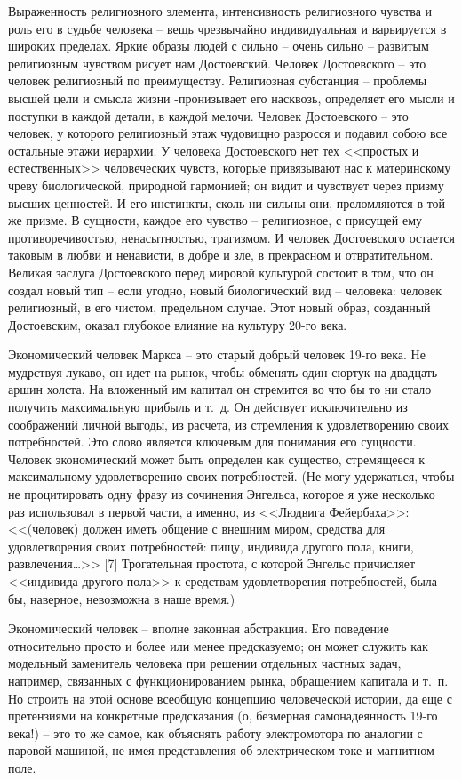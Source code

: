 \documentclass{book}
\begin{document}
Выраженность религиозного элемента, интенсивность рели­гиозного чувства и роль его в судьбе человека -- вещь чрезвы­чайно индивидуальная и варьируется в широких пределах. Яр­кие образы людей с сильно -- очень сильно -- развитым религи­озным чувством рисует нам Достоевский. Человек Достоев­ского -- это человек религиозный по преимуществу.  Религиоз­ная субстанция -- проблемы высшей цели и смысла жизни -пронизывает его насквозь, определяет его мысли и поступки в каждой детали, в каждой мелочи. Человек Достоевского -- это человек, у которого религиозный этаж чудовищно разрос­ся и подавил собою все остальные этажи иерархии. У человека Достоевского нет тех <<простых и естественных>> человеческих чувств, которые привязывают нас к материнскому чреву био­логической, природной гармонией; он видит и чувствует через призму высших ценностей. И его инстинкты, сколь ни сильны они, преломляются в той же призме. В сущности, каждое его чувство -- религиозное, с присущей ему противоречивостью, ненасытностью, трагизмом. И 
человек 
Достоевского остается таковым в любви и ненависти, в добре и зле, в прекрасном и отвратительном. Великая заслуга Достоевского перед мировой культурой состоит в том, что он создал новый тип -- если угодно, новый биологический вид -- человека: человек религиозный, в его чистом, предельном случае. Этот новый образ, созданный Достоевским, оказал глубокое влияние на культуру 20-го века.

Экономический человек Маркса -- это старый добрый чело­век 19-го века. Не мудрствуя лукаво, он идет на рынок, чтобы обменять один сюртук на двадцать аршин холста. На вложен­ный им капитал он стремится во что бы то ни стало получить максимальную прибыль и т.~д. Он действует исключительно из соображений личной выгоды, из расчета, из стремления к удов­летворению своих потребностей.  Это слово является ключевым для понимания его сущности. Человек экономический может быть определен как существо, стремящееся к максимальному удовлетворению своих потребностей. (Не могу удержаться, что­бы не процитировать одну фразу из сочинения Энгельса, кото­рое я уже несколько раз использовал в первой части, а именно, из <<Людвига Фейербаха>>: << (человек) должен иметь обще­ние с внешним миром, средства для удовлетворения своих по­требностей: пищу, индивида другого пола, книги, развлече­ния\ldots>> [7] Трогательная простота, с которой Энгельс причисляет <<индивида другого пола>> к средствам удовлетворения потреб­ностей, 
была бы, 
наверное, невозможна в наше время.)

Экономический человек -- вполне законная абстракция. Его поведение относительно просто и более или менее пред­сказуемо; он может служить как модельный заменитель чело­века при решении отдельных частных задач, например, связанных с функционированием рынка, обращением капитала и т.~п. Но строить на этой основе всеобщую концепцию человеческой истории, да еще с претензиями на конкретные предсказания (о, безмерная самонадеянность 19-го века!) -- это то же самое, как объяснять работу электромотора по аналогии с паровой машиной, не имея представления об электрическом токе и маг­нитном поле.
\end{document}
